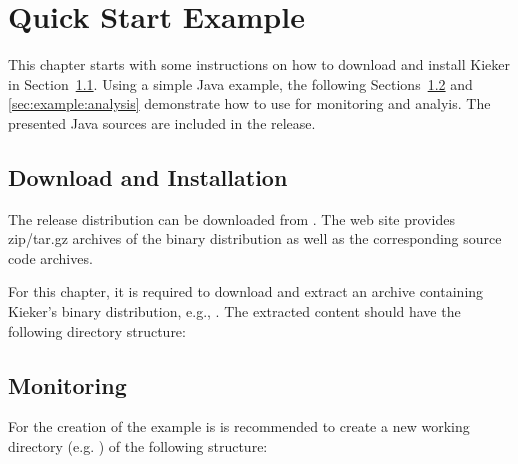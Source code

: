 \chapter{Quick Start Example}
This chapter starts with some instructions on how to download and install Kieker %
in Section~\ref{sec:example:downloadInstall}. %
Using a simple Java example, the following Sections~\ref{sec:example:monitoring} %
and \ref{sec:example:analysis} demonstrate how to use \Kieker{} for monitoring %
and analyis. %
\notify The presented Java sources are included in the \Kieker{} release.

\section{Download and Installation}\label{sec:example:downloadInstall}

The \Kieker{} release distribution can be downloaded from \KiekerURL. The web %
site provides zip/tar.gz archives of the \Kieker{} binary distribution as well %
as the corresponding \Kieker{} source code archives.

For this chapter, it is required to download and extract an archive containing %
Kieker's binary distribution, e.g., .
The extracted content should have the following directory structure:

\vspace{1ex}


	\section{Monitoring}\label{sec:example:monitoring}
		For the creation of the example is is recommended to create a new working directory (e.g. ) of the following structure:

